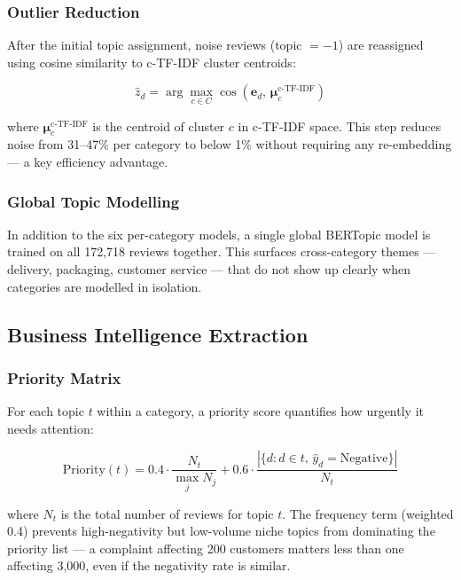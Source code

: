 \subsubsection{Outlier Reduction}
\begin{justify}
After the initial topic assignment, noise reviews (topic $= -1$) are reassigned using cosine similarity to c-TF-IDF cluster centroids:

\begin{equation}
    \hat{z}_d = \arg\max_{c \in C} \cos\!\left(\mathbf{e}_d,\, \boldsymbol{\mu}_c^{\text{c-TF-IDF}}\right)
\end{equation}

where $\boldsymbol{\mu}_c^{\text{c-TF-IDF}}$ is the centroid of cluster $c$ in c-TF-IDF space. This step reduces noise from 31--47\% per category to below 1\% without requiring any re-embedding — a key efficiency advantage.
\end{justify}

\subsubsection{Global Topic Modelling}
\begin{justify}
In addition to the six per-category models, a single global BERTopic model is trained on all 172,718 reviews together. This surfaces cross-category themes — delivery, packaging, customer service — that do not show up clearly when categories are modelled in isolation.
\end{justify}

\subsection{Business Intelligence Extraction}

\subsubsection{Priority Matrix}
\begin{justify}
For each topic $t$ within a category, a priority score quantifies how urgently it needs attention:

\begin{equation}
    \text{Priority}(t) = 0.4 \cdot \frac{N_t}{\max_j N_j} + 0.6 \cdot \frac{|\{d : d \in t,\, \hat{y}_d = \text{Negative}\}|}{N_t}
    \label{eq:priority}
\end{equation}

where $N_t$ is the total number of reviews for topic $t$. The frequency term (weighted 0.4) prevents high-negativity but low-volume niche topics from dominating the priority list — a complaint affecting 200 customers matters less than one affecting 3,000, even if the negativity rate is similar.
\end{justify}

